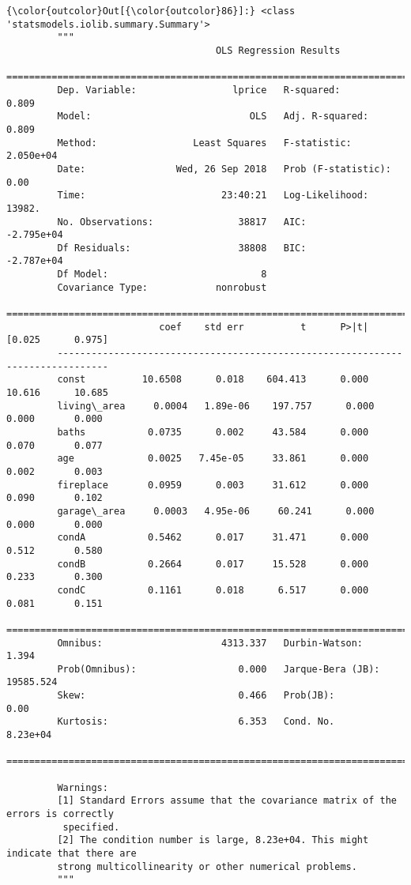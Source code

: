 \documentclass[11pt]{article}
\begin{document}
\begin{Verbatim}[commandchars=\\\{\}]
{\color{outcolor}Out[{\color{outcolor}86}]:} <class 'statsmodels.iolib.summary.Summary'>
         """
                                     OLS Regression Results                            
         ==============================================================================
         Dep. Variable:                 lprice   R-squared:                       0.809
         Model:                            OLS   Adj. R-squared:                  0.809
         Method:                 Least Squares   F-statistic:                 2.050e+04
         Date:                Wed, 26 Sep 2018   Prob (F-statistic):               0.00
         Time:                        23:40:21   Log-Likelihood:                 13982.
         No. Observations:               38817   AIC:                        -2.795e+04
         Df Residuals:                   38808   BIC:                        -2.787e+04
         Df Model:                           8                                         
         Covariance Type:            nonrobust                                         
         ===============================================================================
                           coef    std err          t      P>|t|      [0.025      0.975]
         -------------------------------------------------------------------------------
         const          10.6508      0.018    604.413      0.000      10.616      10.685
         living\_area     0.0004   1.89e-06    197.757      0.000       0.000       0.000
         baths           0.0735      0.002     43.584      0.000       0.070       0.077
         age             0.0025   7.45e-05     33.861      0.000       0.002       0.003
         fireplace       0.0959      0.003     31.612      0.000       0.090       0.102
         garage\_area     0.0003   4.95e-06     60.241      0.000       0.000       0.000
         condA           0.5462      0.017     31.471      0.000       0.512       0.580
         condB           0.2664      0.017     15.528      0.000       0.233       0.300
         condC           0.1161      0.018      6.517      0.000       0.081       0.151
         ==============================================================================
         Omnibus:                     4313.337   Durbin-Watson:                   1.394
         Prob(Omnibus):                  0.000   Jarque-Bera (JB):            19585.524
         Skew:                           0.466   Prob(JB):                         0.00
         Kurtosis:                       6.353   Cond. No.                     8.23e+04
         ==============================================================================
         
         Warnings:
         [1] Standard Errors assume that the covariance matrix of the errors is correctly
          specified.
         [2] The condition number is large, 8.23e+04. This might indicate that there are
         strong multicollinearity or other numerical problems.
         """
\end{Verbatim}
            
\end{document}

